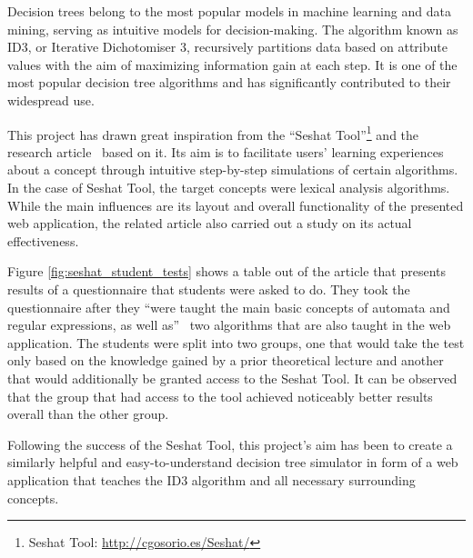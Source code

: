 
Decision trees belong to the most popular models in machine learning and data mining, serving as intuitive models for decision-making. The algorithm known as ID3, or Iterative Dichotomiser 3, recursively partitions data based on attribute values with the aim of maximizing information gain at each step. It is one of the most popular decision tree algorithms and has significantly contributed to their widespread use.

This project has drawn great inspiration from the ``Seshat Tool''\footnote{Seshat Tool: \url{http://cgosorio.es/Seshat/}} and the research article~\cite{https://doi.org/10.1002/cae.22036} based on it. Its aim is to facilitate users' learning experiences about a concept through intuitive step-by-step simulations of certain algorithms. In the case of Seshat Tool, the target concepts were lexical analysis algorithms. While the main influences are its layout and overall functionality of the presented web application, the related article also carried out a study on its actual effectiveness.

Figure \ref{fig:seshat_student_tests} shows a table out of the article that presents results of a questionnaire that students were asked to do. They took the questionnaire after they ``were taught the main basic concepts of automata and regular expressions, as well as''~\cite{https://doi.org/10.1002/cae.22036} two algorithms that are also taught in the web application. The students were split into two groups, one that would take the test only based on the knowledge gained by a prior theoretical lecture and another that would additionally be granted access to the Seshat Tool.
It can be observed that the group that had access to the tool achieved noticeably better results overall than the other group.

Following the success of the Seshat Tool, this project's aim has been to create a similarly helpful and easy-to-understand decision tree simulator in form of a web application that teaches the ID3 algorithm and all necessary surrounding concepts.